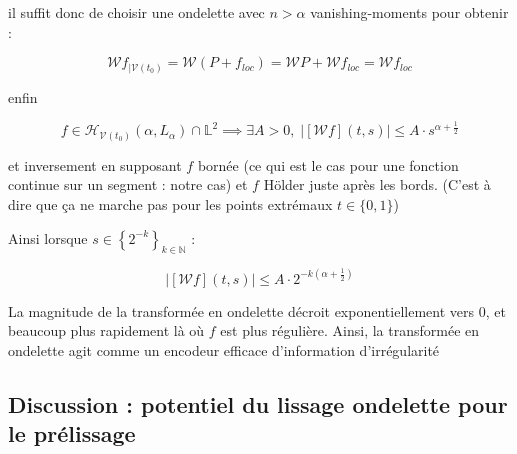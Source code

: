 \begin{prop}

\end{prop}

il suffit donc de choisir une ondelette avec $n > \alpha$ vanishing-moments pour obtenir :

\begin{equation*}
	\mathcal W f_{| \mathcal V(t_0)} {=} \mathcal W ( P + f_{loc} ) = \mathcal W P + \mathcal W f_{loc} = \mathcal W f_{loc}
\end{equation*}

enfin
\begin{thm}


	\begin{equation*}
		f \in \mathcal H_{\mathcal V({t_0})}(\alpha, L_\alpha) \cap \mathds L^2 \implies \exists A>0, \; \left|\left[\mathcal Wf\right](t, s)\right| \leq A \cdot s^{\alpha  + \frac 1 2}
	\end{equation*}

	et inversement en supposant $f$ bornée (ce qui est le cas pour une fonction continue sur un segment : notre cas) et $f$ Hölder juste après les bords. (C'est à dire que ça ne marche pas pour les points extrémaux $t \in \{0, 1\}$)
\end{thm}

Ainsi lorsque $s \in \left\{ 2^{-k} \right\}_{k \in \mathds N}$ :

\begin{equation*}
	\left|\left[\mathcal Wf\right](t, s)\right| \leq A \cdot 2^{-k(\alpha  + \frac 1 2)}
\end{equation*}

La magnitude de la transformée en ondelette décroit exponentiellement vers 0, et beaucoup plus rapidement là où $f$ est plus régulière. Ainsi, la transformée en ondelette agit comme un encodeur efficace d'information d'irrégularité

\subsection{Discussion : potentiel du lissage ondelette pour le prélissage}

